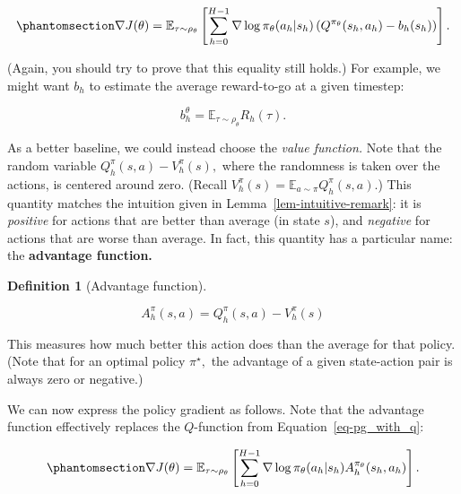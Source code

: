 \documentclass[
  letterpaper,
  DIV=11,
  numbers=noendperiod]{scrreprt}
\theoremstyle{plain}
\theoremstyle{plain}
\theoremstyle{definition}
\theoremstyle{definition}
\newtheorem{definition}{Definition}[chapter]
\theoremstyle{remark}
\begin{document}
\begin{equation}\phantomsection\label{eq-pg_baseline}{
\nabla J(\theta) = \mathbb{E}_{\tau \sim \rho_\theta} \left[
    \sum_{h=0}^{H-1} \nabla \log \pi_\theta (a_h| s_h) \left(
    Q^{\pi_\theta}(s_h, a_h)
    - b_h(s_h)
    \right)
    \right].
}\end{equation}

(Again, you should try to prove that this equality still holds.) For
example, we might want \(b_h\) to estimate the average reward-to-go at a
given timestep:

\[b_h^\theta = \mathbb{E}_{\tau \sim \rho_\theta} R_h(\tau).\]

As a better baseline, we could instead choose the \emph{value function.}
Note that the random variable \(Q^\pi_h(s, a) - V^\pi_h(s),\) where the
randomness is taken over the actions, is centered around zero. (Recall
\(V^\pi_h(s) = \mathbb{E}_{a \sim \pi} Q^\pi_h(s, a).\)) This quantity
matches the intuition given in Lemma~\ref{lem-intuitive-remark}: it is
\emph{positive} for actions that are better than average (in state
\(s\)), and \emph{negative} for actions that are worse than average. In
fact, this quantity has a particular name: the \textbf{advantage
function.}

\begin{definition}[Advantage
function]\protect\hypertarget{def-advantage}{}\label{def-advantage}

\[
A^\pi_h(s, a) = Q^\pi_h(s, a) - V^\pi_h(s)
\]

\end{definition}

This measures how much better this action does than the average for that
policy. (Note that for an optimal policy \(\pi^\star,\) the advantage of
a given state-action pair is always zero or negative.)

We can now express the policy gradient as follows. Note that the
advantage function effectively replaces the \(Q\)-function from
Equation~\ref{eq-pg_with_q}:

\begin{equation}\phantomsection\label{eq-pg_advantage}{
\nabla J(\theta) = \mathbb{E}_{\tau \sim \rho_\theta} \left[
        \sum_{h=0}^{H-1} \nabla \log \pi_\theta(a_h| s_h) A^{\pi_\theta}_h(s_h, a_h)
\right].
}\end{equation}
\end{document}
